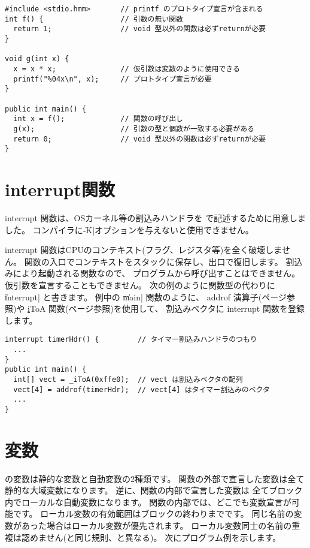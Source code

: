 \begin{mylist}
\begin{verbatim}
#include <stdio.hmm>       // printf のプロトタイプ宣言が含まれる
int f() {                  // 引数の無い関数
  return 1;                // void 型以外の関数は必ずreturnが必要
}

void g(int x) {
  x = x * x;               // 仮引数は変数のように使用できる
  printf("%04x\n", x);     // プロトタイプ宣言が必要
}

public int main() {
  int x = f();             // 関数の呼び出し
  g(x);                    // 引数の型と個数が一致する必要がある
  return 0;                // void 型以外の関数は必ずreturnが必要
}
\end{verbatim}
\end{mylist}

\section{interrupt関数}
interrupt 関数は、OSカーネル等の割込みハンドラを\cmml
で記述するために用意しました。
コンパイラに\|-K|オプションを与えないと使用できません。

interrupt 関数はCPUのコンテキスト(フラグ、レジスタ等)を全く破壊しません。
関数の入口でコンテキストをスタックに保存し、出口で復旧します。
割込みにより起動される関数なので、
プログラムから呼び出すことはできません。
仮引数を宣言することもできません。
次の例のように関数型の代わりに \|interrupt| と書きます。
例中の \|main| 関数のように、
addrof 演算子(\pageref{chap3:addrof}ページ参照)や
\ul iToA 関数(\pageref{chap4:itoa}ページ参照)を使用して、
割込みベクタに interrupt 関数を登録します。

\begin{mylist}
\begin{verbatim}
interrupt timerHdr() {         // タイマー割込みハンドラのつもり
  ...
}
public int main() {
  int[] vect = _iToA(0xffe0);  // vect は割込みベクタの配列
  vect[4] = addrof(timerHdr);  // vect[4] はタイマー割込みのベクタ
  ...
}
\end{verbatim}
\end{mylist}

\section{変数}

\cmml の変数は静的な変数と自動変数の2種類です。
関数の外部で宣言した変数は全て静的な大域変数になります。
逆に、関数の内部で宣言した変数は
全てブロック内でローカルな自動変数になります。
関数の内部では、どこでも変数宣言が可能です。
ローカル変数の有効範囲はブロックの終わりまでです。
同じ名前の変数があった場合はローカル変数が優先されます。
ローカル変数同士の名前の重複は認めません(\javal と同じ規則、\cl と異なる)。
次にプログラム例を示します。

